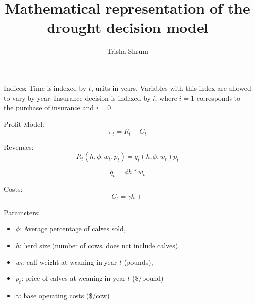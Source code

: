 \documentclass[11pt]{amsart}
\title{Mathematical representation of the drought decision model}
\author{Trisha Shrum}
\begin{document}
\maketitle


Indices:
Time is indexed by $t$, units in years. Variables with this index are allowed to vary by year.
Insurance decision is indexed by $i$, where $i=1$ corresponds to the purchase of insurance and $i=0$

Profit Model:
\begin{equation}
\pi_t = R_t - C_t
\end{equation}

Revenues:
\begin{equation}
R_t(h,\phi, w_t, p_t) = q_t (h,\phi, w_t) p_t
\end{equation}

\begin{equation}
q_t = \phi h * w_t
\end{equation}

Costs:
\begin{equation}
C_t = \gamma h + 
\end{equation}

Parameters:
\begin{itemize}
\item \(\phi\): Average percentage of calves sold, 
\item \(h\): herd size (number of cows, does not include calves), 
\item $w_t$: calf weight at weaning in year \(t\) (pounds), 
\item $p_t$: price of calves at weaning in year \(t\) (\$/pound)
\item \(\gamma\): base operating costs (\$/cow)
\end{itemize}
\end{document}
